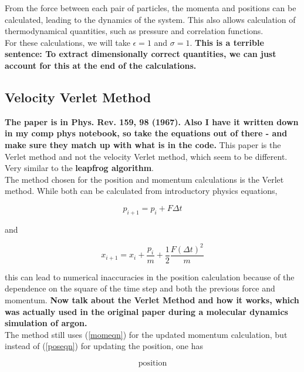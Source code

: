 \documentclass{article}
\begin{document}
\begin{multicols}{2}
\noindent From the force between each pair of particles, the momenta and positions can be calculated, leading to the dynamics of the system.  This also allows calculation of thermodynamical quantities, such as pressure and correlation functions.\\

For these calculations, we will take $\epsilon =1$ and $\sigma =1$.  \textbf{This is a terrible sentence:  To extract dimensionally correct quantities, we can just account for this at the end of the calculations. } 

\subsection{Velocity Verlet Method}

\textbf{The paper is in Phys. Rev. 159, 98 (1967).  Also I have it written down in my comp phys notebook, so take the equations out of there - and make sure they match up with what is in the code.} This paper is the Verlet method and not the velocity Verlet method, which seem to be different.  Very similar to the \textbf{leapfrog algorithm}.  \\

The method chosen for the position and momentum calculations is the Verlet method.  While both can be calculated from introductory physics equations,

\begin{equation}
\label{momeqn}
p_{i+1}=p_i + F \Delta t
\end{equation}

\noindent and

\begin{equation}
\label{poseqn}
x_{i+1} = x_i + \frac{p_i}{m} + \frac{1}{2}\frac{F(\Delta t)^2}{m}
\end{equation}

\noindent this can lead to numerical inaccuracies in the position calculation because of the dependence on the square of the time step and both the previous force and momentum.  \textbf{Now talk about the Verlet Method and how it works, which was actually used in the original paper during a molecular dynamics simulation of argon.}\\

The method still uses (\ref{momeqn}) for the updated momentum calculation, but instead of (\ref{poseqn}) for updating the position, one has

\begin{equation}
\mathrm{position}
\end{equation}


\end{multicols}
\end{document}
